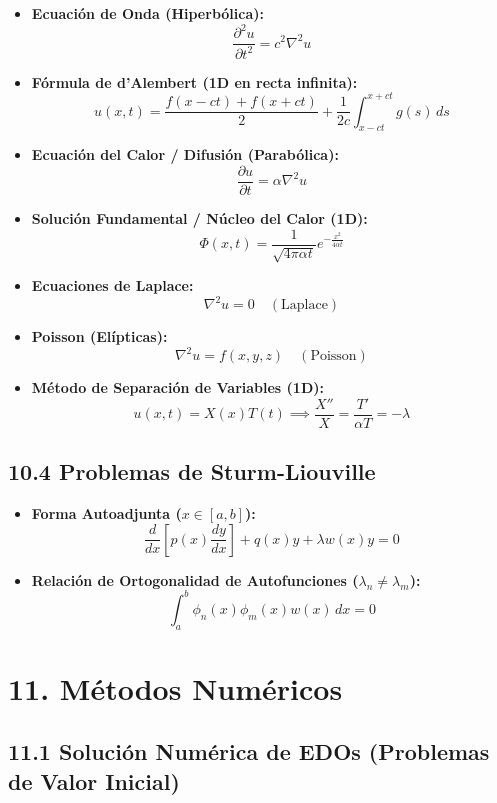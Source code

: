 \documentclass[11pt,a4paper]{article}
\begin{document}
\begin{itemize}
  \item \textbf{Ecuación de Onda (Hiperbólica):}
  \[
    \frac{\partial^2 u}{\partial t^2} = c^2 \nabla^2 u
  \]
  \item \textbf{Fórmula de d'Alembert (1D en recta infinita):}
  \[
    u(x, t) = \frac{f(x - ct) + f(x + ct)}{2} + \frac{1}{2c}\int_{x - ct}^{x + ct} g(s) \, ds
  \]
  \item \textbf{Ecuación del Calor / Difusión (Parabólica):}
  \[
    \frac{\partial u}{\partial t} = \alpha \nabla^2 u
  \]
  \item \textbf{Solución Fundamental / Núcleo del Calor (1D):}
  \[
    \Phi(x, t) = \frac{1}{\sqrt{4\pi \alpha t}} e^{-\frac{x^2}{4\alpha t}}
  \]
  \item \textbf{Ecuaciones de Laplace:}
  \[
    \nabla^2 u = 0 \quad (\text{Laplace})
  \]
  \item \textbf{Poisson (Elípticas):}
  \[
    \nabla^2 u = f(x, y, z) \quad (\text{Poisson})
  \]
  \item \textbf{Método de Separación de Variables (1D):}
  \[
    u(x, t) = X(x)T(t) \implies \frac{X''}{X} = \frac{T'}{\alpha T} = -\lambda
  \]
\end{itemize}

\subsection*{10.4 Problemas de Sturm-Liouville}

\begin{itemize}
  \item \textbf{Forma Autoadjunta ($x \in [a, b]$):}
  \[
    \frac{d}{dx}\left[ p(x)\frac{dy}{dx} \right] + q(x)y + \lambda w(x)y = 0
  \]
  \item \textbf{Relación de Ortogonalidad de Autofunciones ($\lambda_n \ne \lambda_m$):}
  \[
    \int_a^b \phi_n(x)\phi_m(x)w(x) \, dx = 0
  \]
\end{itemize}

\section*{11. Métodos Numéricos}

\subsection*{11.1 Solución Numérica de EDOs (Problemas de Valor Inicial)}
\end{document}
